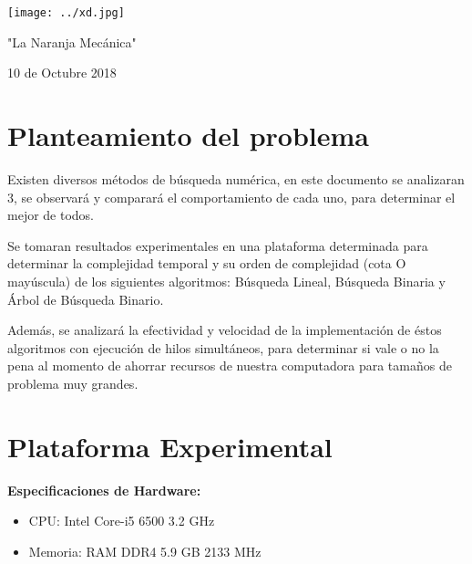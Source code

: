\documentclass[12pt]{article}
\begin{document}
\begin{titlepage}
\begin{center}
					\begin{minipage}{0.5\textwidth}
					\begin{center} \large
						\texttt{[image: ../xd.jpg]}
						\caption*{"La Naranja Mecánica"}
					\end{center}
				\end{minipage}

				\vfill
				
				{\large 10 de Octubre 2018}
			\end{center}
		\end{titlepage}
	
	\tableofcontents
	\newpage
	\section{Planteamiento del problema}
	Existen diversos métodos de búsqueda numérica, en este documento se analizaran 3, se observará y comparará el comportamiento de cada uno, para determinar el mejor de todos.
    
    Se tomaran resultados experimentales en una plataforma determinada para determinar la complejidad temporal y su orden de complejidad (cota O mayúscula) de los siguientes algoritmos: Búsqueda Lineal, Búsqueda Binaria y Árbol de Búsqueda Binario.
    
    Además, se analizará la efectividad y velocidad de la implementación de éstos algoritmos con ejecución de hilos simultáneos, para determinar si vale o no la pena al momento de ahorrar recursos de nuestra computadora para tamaños de problema muy grandes.

	
    \section{Plataforma Experimental}
	
	    \textbf{Especificaciones de Hardware:}
	    \begin{itemize}
	        \item CPU: Intel Core-i5 6500 3.2 GHz
	        \item Memoria: RAM DDR4 5.9 GB 2133 MHz
	    \end{itemize}
    
\end{document}
